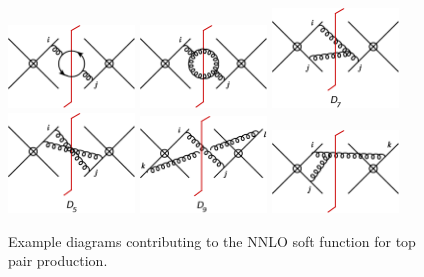 \documentclass{PoS}
\begin{document}
\begin{figure}[t]
  \begin{center}
    \includegraphics[width=0.30\textwidth]{plots/sf-nnlo-nf.png}
    \hfill
    \includegraphics[width=0.30\textwidth]{plots/sf-nnlo-gluon.png}
    \hfill
    \includegraphics[width=0.30\textwidth, trim ={0 65pt 0 0}, clip]{plots/sf-nnlo-3gv.png}
    \hfill
    \vspace{20pt}
    \includegraphics[width=0.30\textwidth, trim ={0 65pt 0 0}, clip]{plots/sf-nnlo-d5.png}
    \hfill
    \includegraphics[width=0.30\textwidth, trim ={0 65pt 0 0}, clip]{plots/sf-nnlo-4wl.png}
    \hfill
    \includegraphics[width=0.30\textwidth]{plots/sf-nnlo-real-virtual1.png}
  \end{center}
  \caption{
    Example diagrams contributing to the NNLO soft function for top pair
    production.
  }
  \label{fig:example-sf-diagrams}
\end{figure}
\end{document}
